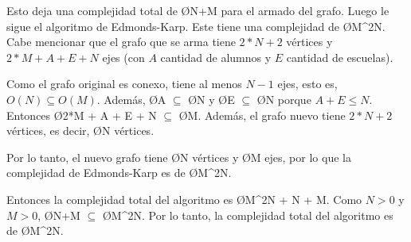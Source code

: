 Esto deja una complejidad total de \O{N+M} para el armado del grafo. Luego le sigue el algoritmo de Edmonds-Karp. Este tiene una complejidad de \O{M^2N}. Cabe mencionar que el grafo que se arma tiene $2*N+2$ vértices y $2*M + A + E + N$ ejes (con $A$ cantidad de alumnos y $E$ cantidad de escuelas). 


Como el grafo original es conexo, tiene al menos $N-1$ ejes, esto es,  $O(N) \subseteq O(M)$. Además, \O{A} $\subseteq$ \O{N} y \O{E} $\subseteq$ \O{N} porque $A+E \leq N$. Entonces \O{2*M + A + E + N} $\subseteq$ \O{M}. Además, el grafo nuevo tiene $2*N+2$ vértices, es decir, \O{N} vértices. 

Por lo tanto, el nuevo grafo tiene \O{N} vértices y \O{M} ejes, por lo que la complejidad de Edmonds-Karp es de \O{M^2N}.

Entonces la complejidad total del algoritmo es \O{M^2N + N + M}. Como $N > 0$ y $M>0$, \O{N+M} $\subseteq$ \O{M^2N}. Por lo tanto, la complejidad total del algoritmo es de \O{M^2N}.